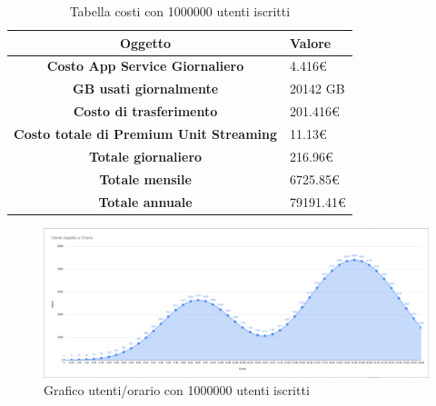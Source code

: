 \begin{table}[H]
    \label{tab:costi-1000000}
    \begin{tabularx}{\textwidth}{|c|X|}
        \hline
        \textbf{Oggetto} & \textbf{Valore} \\\hline
        
        \textbf{Costo App Service Giornaliero} & {4.416€} \\ 
        \hline
        \textbf{GB usati giornalmente} & {20142 GB} \\ 
        \hline
        \textbf{Costo di trasferimento} & {201.416€}\\
        \hline
        \textbf{Costo totale di Premium Unit Streaming} & {11.13€}\\  
        \hline
        \textbf{Totale giornaliero} & {216.96€}\\  
        \hline
        \textbf{Totale mensile} & {6725.85€}\\  
        \hline
        \textbf{Totale annuale} & {79191.41€}\\  
        \hline
    \end{tabularx}
    \caption{Tabella costi con 1000000 utenti iscritti}
\end{table}
\begin{figure}[H]
    \centering
    \includegraphics[scale=0.25]{images/costi/1000kuser.png}
    \caption{Grafico utenti/orario con 1000000 utenti iscritti}
    \label{fig:costi-1000000}
\end{figure}